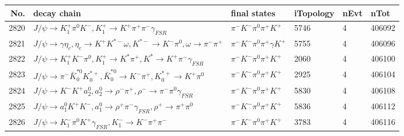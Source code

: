 \begin{table}[htbp] 
\begin{center}
\begin{small}
\begin{tabular}{rlllll}\hline\hline
 No. & decay chain & final states &  iTopology & nEvt & nTot \\\hline
2820&$J/\psi       \rightarrow K_1^{+}        \pi^{0}        K^{-}          , K_1^{+}         \rightarrow K^{+}          \pi^{+}        \pi^{-}        \gamma_{FSR} $&$\pi^{-}        K^{-}          \pi^{0}        \pi^{+}        K^{+}          $& 5746&    4&406092\\
2821&$J/\psi       \rightarrow \gamma       \eta_{c}    , \eta_{c}     \rightarrow K^{+}          K^{*-}         \omega         , K^{*-}          \rightarrow K^{-}          \pi^{0}        , \omega          \rightarrow \pi^{-}        \pi^{+}        $&$\pi^{-}        K^{-}          \pi^{0}        \pi^{+}        \gamma       K^{+}          $& 5755&    4&406096\\
2822&$J/\psi       \rightarrow K_1^{+}        K^{-}          \pi^{0}        , K_1^{+}         \rightarrow K^{*}          \pi^{+}        , K^{*}           \rightarrow K^{+}          \pi^{-}        \gamma_{FSR} $&$\pi^{-}        K^{-}          \pi^{0}        \pi^{+}        K^{+}          $& 2060&    4&406100\\
2823&$J/\psi       \rightarrow \pi^{-}        \bar{K}_0^{*0}K_{0}^{*+}     , \bar{K}_0^{*0} \rightarrow K^{-}          \pi^{+}        , K_{0}^{*+}      \rightarrow K^{+}          \pi^{0}        $&$\pi^{-}        K^{-}          \pi^{0}        \pi^{+}        K^{+}          $& 2925&    4&406104\\
2824&$J/\psi       \rightarrow K^{-}          K^{+}          a_{2}^{0}      , a_{2}^{0}       \rightarrow \rho^{-}      \pi^{+}        , \rho^{-}       \rightarrow \pi^{-}        \pi^{0}        \gamma_{FSR} $&$\pi^{-}        K^{-}          \pi^{0}        \pi^{+}        K^{+}          $& 5830&    4&406108\\
2825&$J/\psi       \rightarrow a_{1}^{0}      K^{+}          K^{-}          , a_{1}^{0}       \rightarrow \rho^{+}      \pi^{-}        \gamma_{FSR} , \rho^{+}       \rightarrow \pi^{+}        \pi^{0}        $&$\pi^{-}        K^{-}          \pi^{0}        \pi^{+}        K^{+}          $& 5836&    4&406112\\
2826&$J/\psi       \rightarrow K_{1}^{-}      \pi^{0}        K^{+}          \gamma_{FSR} , K_{1}^{-}       \rightarrow K^{-}          \pi^{+}        \pi^{-}        $&$\pi^{-}        K^{-}          \pi^{0}        \pi^{+}        K^{+}          $& 3783&    4&406116\\

\end{tabular}
\end{small}
\end{center}
\end{table}
